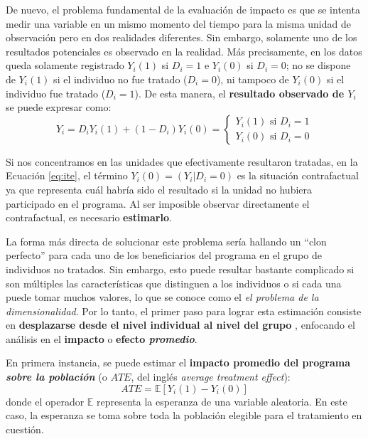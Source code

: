 \documentclass[../../main.tex]{subfiles}
\begin{document}
De nuevo, el problema fundamental de la evaluación de impacto es que se intenta medir una
variable en un mismo momento del tiempo para la misma unidad de observación pero en dos
realidades diferentes. Sin embargo, solamente uno de los resultados potenciales es
observado en la realidad. Más precisamente, en los datos queda solamente registrado
\(Y_i(1)\) si \(D_i=1\) e \(Y_i(0)\) si \(D_i=0\); no se dispone de \(Y_i(1)\) si el
individuo no fue tratado (\(D_i=0\)), ni tampoco de \(Y_i(0)\) si el individuo fue tratado
(\(D_i=1\)). De esta manera, el \textbf{resultado observado de \(Y_i\)} se puede expresar
como:
\begin{equation}
    Y_i = D_i Y_i(1) + (1-D_i)Y_i(0) =
    \begin{cases}
        Y_i(1) \text{ si } D_i=1 \\
        Y_i(0) \text{ si } D_i=0
    \end{cases}
    \label{eq:observed-result}
\end{equation}

Si nos concentramos en las unidades que efectivamente resultaron tratadas, en la Ecuación
\ref{eq:ite}, el término \(Y_i(0) = (Y_i|D_i=0)\) es la situación contrafactual ya que
representa cuál habría sido el resultado si la unidad no hubiera participado en el
programa. Al ser imposible observar directamente el contrafactual, es necesario
\textbf{estimarlo}.

La forma más directa de solucionar este problema sería hallando un ``clon perfecto'' para
cada uno de los beneficiarios del programa en el grupo de individuos no tratados. Sin
embargo, esto puede resultar bastante complicado si son múltiples las características que
distinguen a los individuos o si cada una puede tomar muchos valores, lo que se conoce
como el \textit{el problema de la dimensionalidad}. Por lo tanto, el primer paso para
lograr esta estimación consiste en \textbf{desplazarse desde el nivel individual al nivel
del grupo} \cite{gertler-2016}, enfocando el análisis en el \textbf{impacto} o
\textbf{efecto \textit{promedio}}.

En primera instancia, se puede estimar el \textbf{impacto promedio del programa
\textit{sobre la población}} (o \(ATE\), del inglés \textit{average treatment effect}):
\begin{equation}
    ATE = \mathbb{E}\left[Y_i(1)-Y_i(0)\right]
\end{equation}
donde el operador \(\mathbb{E}\) representa la esperanza de una variable aleatoria.
En este caso, la esperanza se toma sobre toda la población elegible para el tratamiento
en cuestión.
\end{document}
